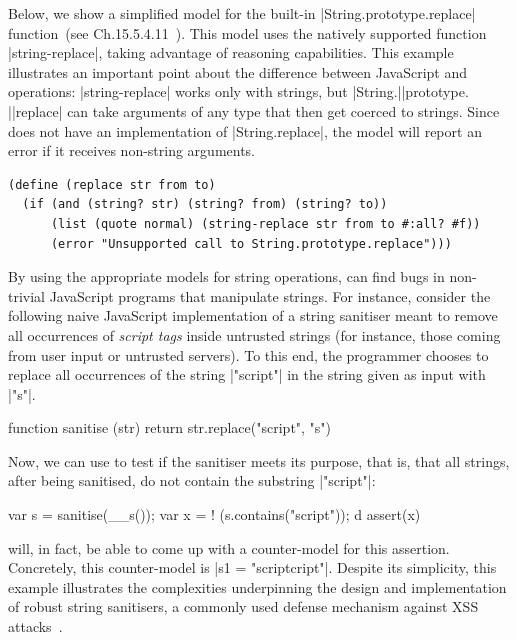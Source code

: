 Below, we show a simplified \rosette model for the built-in \jsinline|String.prototype.replace|
function~(see Ch.15.5.4.11~\cite{ecma}).
This model uses the natively supported function \schemeinline|string-replace|, 
 taking advantage of \rosette reasoning capabilities.
This example illustrates an important point about the difference between JavaScript and
\rosette operations: \schemeinline|string-replace| works only with strings, but \jsinline|String.|\jsinline|prototype. |\jsinline|replace| can take arguments of any type that then get coerced to strings. Since \JSComp does not have an implementation of \jsinline|String.replace|, the \rosette model will report an error if it receives non-string arguments.
\begin{lstlisting}
(define (replace str from to)
  (if (and (string? str) (string? from) (string? to))
      (list (quote normal) (string-replace str from to #:all? #f))
      (error "Unsupported call to String.prototype.replace")))
\end{lstlisting}

By using the appropriate \rosette models for string operations, \jilette can find bugs in  
non-trivial JavaScript programs that manipulate strings. For instance, consider 
the following naive JavaScript implementation of a string sanitiser meant to remove 
all occurrences of \emph{script tags} inside untrusted strings (for instance, those coming 
from user input or untrusted servers).
To this end, the programmer chooses to 
replace all occurrences of the string \jsinline|"script"| in the string given 
as input with \jsinline|"s"|. 
\begin{lstjsex}
function sanitise (str) { return str.replace("script", "s") }
\end{lstjsex}
Now, we can use \jilette to test if the sanitiser meets its purpose, that is, that all
strings, after being sanitised, do not contain the substring \jsinline|"script"|:
\begin{lstjsex}
var s = sanitise(__s()); 
var x = ! (s.contains("script")); d
assert(x) 
\end{lstjsex}
\jilette will, in fact, be able to come up with a counter-model for this assertion. Concretely, this counter-model is \jsinline|s1 = "scriptcript"|. Despite its simplicity, this example illustrates the complexities underpinning the 
design and implementation of robust string sanitisers, a commonly  
used defense mechanism against XSS attacks~\cite{song}. 
 
 

 
 

%






